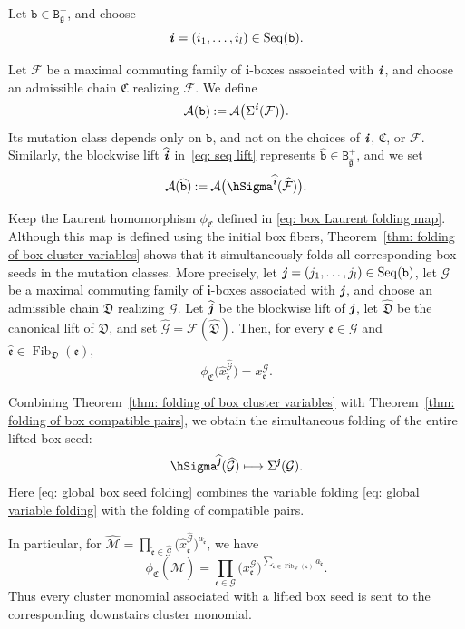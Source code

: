 \documentclass[12pt, leqno]{amsart}
\numberwithin{equation}{section}
\theoremstyle{plain}
\theoremstyle{definition}
\newcommand{\seteq}{\mathbin{:=}}
\newcommand{\g}{\mathfrak{g}}
\newcommand{\ii}{ \textbf{\textit{i}}}
\newcommand{\jj}{ \textbf{\textit{j}}}
\newcommand{\Fib}{\operatorname{Fib}}
\newcommand{\hg}{{\widehat{\g}}}
\newcommand{\hx}{\widehat{x}}
\newcommand{\hii}{{\widehat{\ii}}}
\newcommand{\hjj}{{\widehat{\jj}}}
\newcommand{\frakC}{\mathfrak{C}}
\newcommand{\frakD}{\mathfrak{D}}
\newcommand{\frake}{\mathfrak{e}}
\newcommand{\hfrake}{\widehat{\frake}}
\newcommand{\hfrakD}{\widehat{\frakD}}
\newcommand{\bfi}{\mathbf{i}}
\newcommand{\calA}{\mathcal{A}}
\newcommand{\calF}{\mathcal{F}}
\newcommand{\calG}{\mathcal{G}}
\newcommand{\calM}{\mathcal{M}}
\newcommand{\hcalF}{{\widehat{\calF}}}
\newcommand{\hcalG}{{\widehat{\calG}}}
\newcommand{\hcalM}{\widehat{\calM}}
\newcommand{\ttB}{\mathtt{B}}
\newcommand{\ttb}{\mathtt{b}}
\newcommand{\httb}{\widehat{\ttb}}
\newcommand{\Seq}{\mathrm{Seq}}
\begin{document}
Let \(\ttb\in\ttB_\g^+\), and choose
\[
\ii=(i_1,\ldots,i_l)\in\Seq(\ttb).
\]
 

Let \(\calF\) be a maximal commuting family of \(\bfi\)-boxes
associated with \(\ii\), and choose an admissible chain \(\frakC\)
realizing \(\calF\).  We define
\[
\calA(\ttb) \seteq \calA\bigl(\Sigma^\ii(\calF)\bigr).
\]
Its mutation class depends only on \(\ttb\), and not on the choices of
\(\ii\), \(\frakC\), or \(\calF\).
Similarly, the blockwise lift \(\hii\) in~\eqref{eq: seq lift} represents \(\httb\in\ttB_\hg^+\), and we set
\[
\calA(\httb) \seteq \calA\bigl(\hSigma^\hii(\hcalF)\bigr).
\]

Keep the Laurent homomorphism \(\phi_{\frakC}\) defined in
\eqref{eq: box Laurent folding map}.  Although this map is defined
using the initial box fibers, Theorem~\ref{thm: folding of box cluster variables}
shows that it simultaneously folds all corresponding box seeds in
the mutation classes.  More precisely, let
\(\jj=(j_1,\ldots,j_l)\in\Seq(\ttb)\), let \(\calG\) be a maximal
commuting family of \(\bfi\)-boxes associated with \(\jj\), and
choose an admissible chain \(\frakD\) realizing \(\calG\).    Let \(\hjj\) be the blockwise lift of \(\jj\), let \(\hfrakD\)
be the canonical lift of \(\frakD\), and set
\(\hcalG=\calF(\hfrakD)\).  Then, for every
\(\frake\in\calG\) and
\(\hfrake\in\Fib_{\frakD}(\frake)\),
\begin{equation}\label{eq: global variable folding}
\phi_{\frakC}
\bigl(
\hx_{\hfrake}^{\hcalG}
\bigr)
=
x_{\frake}^{\calG}.
\end{equation}

Combining Theorem~\ref{thm: folding of box cluster variables} with
Theorem~\ref{thm: folding of box compatible pairs}, we obtain the
simultaneous folding of the entire lifted box seed:
\begin{equation}\label{eq: global box seed folding}
\hSigma^\hjj(\hcalG)
\longmapsto
\Sigma^\jj(\calG).
\end{equation}
 Here \eqref{eq: global box seed folding} combines the variable folding
\eqref{eq: global variable folding} with the folding of compatible pairs.


In particular, for
$\hcalM = \prod_{\hfrake\in\hcalG} \bigl(\hx_{\hfrake}^{\hcalG}\bigr)^{a_{\hfrake}}$,
we have
\[
\phi_{\frakC}(\hcalM) = \prod_{\frake\in\calG} \bigl(x_\frake^\calG\bigr)^{ \sum_{\hfrake\in\Fib_{\frakD}(\frake)} a_{\hfrake}}.
\]
Thus every cluster monomial associated with a lifted box seed is
sent to the corresponding downstairs cluster monomial.
\end{document}
